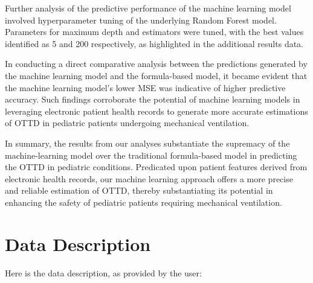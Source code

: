 \documentclass[11pt]{article}
\begin{document}
Further analysis of the predictive performance of the machine learning model involved hyperparameter tuning of the underlying Random Forest model. Parameters for maximum depth and estimators were tuned, with the best values identified as 5 and 200 respectively, as highlighted in the additional results data. 

In conducting a direct comparative analysis between the predictions generated by the machine learning model and the formula-based model, it became evident that the machine learning model's lower MSE was indicative of higher predictive accuracy. Such findings corroborate the potential of machine learning models in leveraging electronic patient health records to generate more accurate estimations of OTTD in pediatric patients undergoing mechanical ventilation.

In summary, the results from our analyses substantiate the supremacy of the machine-learning model over the traditional formula-based model in predicting the OTTD in pediatric conditions. Predicated upon patient features derived from electronic health records, our machine learning approach offers a more precise and reliable estimation of OTTD, thereby substantiating its potential in enhancing the safety of pediatric patients requiring mechanical ventilation.


\clearpage
\appendix

\section{Data Description} \label{sec:data_description} Here is the data description, as provided by the user:
\end{document}
